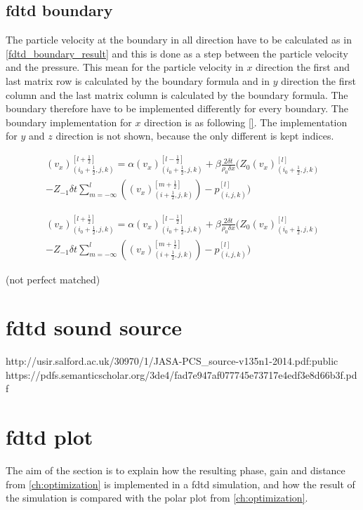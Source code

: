 \subsection{\gls{fdtd} boundary}
The particle velocity at the boundary in all direction have to be calculated as in \autoref{fdtd_boundary_result} and this is done as a step between the particle velocity and the pressure. This mean for the particle velocity in $x$ direction the first and last matrix row is calculated by the boundary formula and in $y$ direction the first column and the last matrix column is calculated by the boundary formula. The boundary therefore have to be implemented differently for every boundary. The boundary implementation for $x$ direction is as following \autoref{}. The implementation for $y$ and $z$ direction is not shown, because the only different is kept indices. 

\begin{multline}\label{fdtd_boundary_x1}
(v_x)_{(i_0+\frac{1}{2},j,k)}^{[l+\frac{1}{2}]}= \alpha (v_x)_{(i_0+\frac{1}{2},j,k)}^{[l-\frac{1}{2}]} + \beta \frac{2 \delta t}{\rho_0 \delta x} \Biggl( 
 Z_0(v_x)_{(i_0+\frac{1}{2},j,k)}^{[l]} \\
-Z_{-1} \delta t \sum_{m=-\infty}^{l} \left( (v_x)_{(i+\frac{1}{2},j,k)}^{[m+\frac{1}{2}]} \right) -p_{(i,j,k)}^{[l]}
\Biggr)
\end{multline}

\begin{multline}\label{fdtd_boundary_x2}
(v_x)_{(i_0+\frac{1}{2},j,k)}^{[l+\frac{1}{2}]}= \alpha (v_x)_{(i_0+\frac{1}{2},j,k)}^{[l-\frac{1}{2}]} + \beta \frac{2 \delta t}{\rho_0 \delta x} \Biggl( 
 Z_0(v_x)_{(i_0+\frac{1}{2},j,k)}^{[l]} \\
-Z_{-1} \delta t \sum_{m=-\infty}^{l} \left( (v_x)_{(i+\frac{1}{2},j,k)}^{[m+\frac{1}{2}]} \right) -p_{(i,j,k)}^{[l]}
\Biggr)
\end{multline}


(not perfect matched)


\section{\gls{fdtd} sound source}

http://usir.salford.ac.uk/30970/1/JASA-PCS_source-v135n1-2014.pdf:public
https://pdfs.semanticscholar.org/3de4/fad7e947af077745e73717e4edf3e8d66b3f.pdf

\section{\gls{fdtd} plot}
The aim of the section is to explain how the resulting phase, gain and distance from \autoref{ch:optimization} is implemented in a \gls{fdtd} simulation, and how the result of the simulation is compared with the polar plot from \autoref{ch:optimization}. \\

